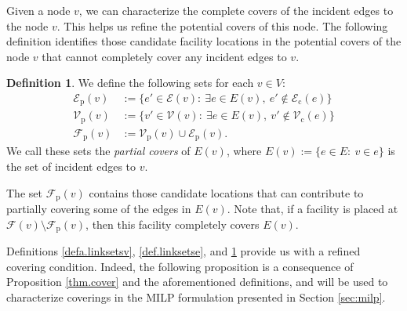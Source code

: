 \documentclass[review]{elsarticle}
\newcommand{\cF}{{\mathcal F}}
\newcommand{\cE}{{\mathcal E}}
\newcommand{\cV}{{\mathcal V}}
\theoremstyle{definition}
\newtheorem{definition}{Definition}[section]
\begin{document}
Given a node $v$, we can characterize the complete covers of the incident edges to the node $v$. This helps us refine the potential covers of this node.  The following definition  identifies those candidate facility locations in the potential covers of the node $v$ that cannot completely cover any incident edges to $v$.
\begin{definition} \label{defa.linksetsvincident}
We define the following sets for each $v\in V$:
\begin{align}
\cE_{\mathrm{p}}(v)&:=\{e'\in \cE(v):\: \exists e\in E(v),\: e'\notin\cE_{\mathrm{c}}(e)\} \nonumber\\  \cV_{\mathrm{p}}(v)&:=\{v'\in \cV(v):\: \exists e\in E(v),\: v'\notin\cV_{\mathrm{c}}(e)\}   \nonumber\\
\cF_{\mathrm{p}}(v)&:=\cV_{\mathrm{p}}(v)\cup\cE_{\mathrm{p}}(v).
\end{align}
We call these sets the \emph{partial covers} of $E(v)$, where $E(v):=\{e\in E:\: v\in e\}$ is the set of incident edges to $v$.
\end{definition}
The set $\cF_{\mathrm{p}}(v)$ contains those candidate locations that can contribute to partially covering some of the edges in $E(v)$. Note that, if a facility is placed at $\cF(v)\setminus \cF_{\mathrm{p}}(v)$, then this facility completely covers  $E(v)$.

Definitions  \ref{defa.linksetsv}, \ref{def.linksetse}, and \ref{defa.linksetsvincident}  provide us with a refined covering condition. Indeed, the following proposition is a consequence of Proposition \ref{thm.cover} and the aforementioned definitions, and will be used to characterize coverings in the MILP formulation presented in Section \ref{sec:milp}.
\end{document}
